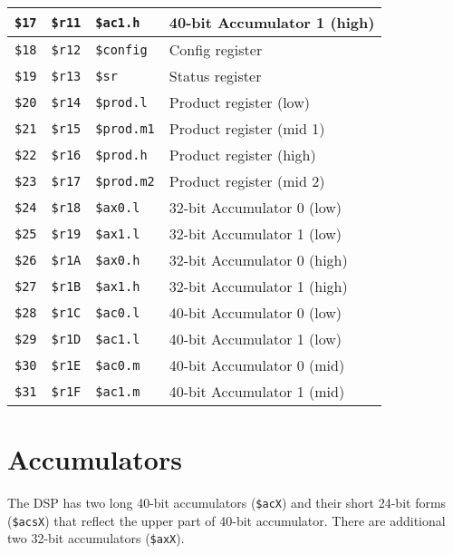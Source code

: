 \documentclass[oneside,english,a4paper,10pt,oneside,openany,final]{memoir}
\newcommand{\Register}[1]{\texttt{#1}}
\begin{document}
\begin{table}[htb]
\begin{tabular}{|l|l|l|l|}
\Register{\$17} & \Register{\$r11} & \Register{\$ac1.h}   & 40-bit Accumulator 1 (high) \\ \hline
\Register{\$18} & \Register{\$r12} & \Register{\$config}  & Config register             \\ \hline
\Register{\$19} & \Register{\$r13} & \Register{\$sr}      & Status register             \\ \hline
\Register{\$20} & \Register{\$r14} & \Register{\$prod.l}  & Product register (low)      \\ \hline
\Register{\$21} & \Register{\$r15} & \Register{\$prod.m1} & Product register (mid 1)    \\ \hline
\Register{\$22} & \Register{\$r16} & \Register{\$prod.h}  & Product register (high)     \\ \hline
\Register{\$23} & \Register{\$r17} & \Register{\$prod.m2} & Product register (mid 2)    \\ \hline
\Register{\$24} & \Register{\$r18} & \Register{\$ax0.l}   & 32-bit Accumulator 0 (low)  \\ \hline
\Register{\$25} & \Register{\$r19} & \Register{\$ax1.l}   & 32-bit Accumulator 1 (low)  \\ \hline
\Register{\$26} & \Register{\$r1A} & \Register{\$ax0.h}   & 32-bit Accumulator 0 (high) \\ \hline
\Register{\$27} & \Register{\$r1B} & \Register{\$ax1.h}   & 32-bit Accumulator 1 (high) \\ \hline
\Register{\$28} & \Register{\$r1C} & \Register{\$ac0.l}   & 40-bit Accumulator 0 (low)  \\ \hline
\Register{\$29} & \Register{\$r1D} & \Register{\$ac1.l}   & 40-bit Accumulator 1 (low)  \\ \hline
\Register{\$30} & \Register{\$r1E} & \Register{\$ac0.m}   & 40-bit Accumulator 0 (mid)  \\ \hline
\Register{\$31} & \Register{\$r1F} & \Register{\$ac1.m}   & 40-bit Accumulator 1 (mid)  \\ \hline
\end{tabular}
\end{table}

\section{Accumulators}

The DSP has two long 40-bit accumulators (\Register{\$acX}) and their short 24-bit forms (\Register{\$acsX}) that reflect the
upper part of 40-bit accumulator. There are additional two 32-bit accumulators (\Register{\$axX}).
\end{document}
